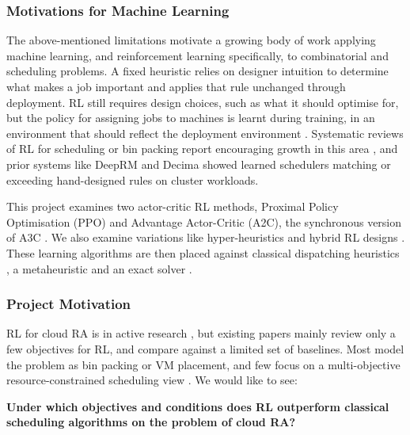 \documentclass[12pt]{article}
\begin{document}
\subsubsection{Motivations for Machine Learning}
The above-mentioned limitations motivate a growing body of work applying machine learning, and reinforcement learning specifically, to combinatorial and scheduling problems. A fixed heuristic relies on designer intuition to determine what makes a job important and applies that rule unchanged through deployment. RL still requires design choices, such as what it should optimise for, but the policy for assigning jobs to machines is learnt during training, in an environment that should reflect the deployment environment \cite{ml_ra_litrev2025}. Systematic reviews of RL for scheduling or bin packing report encouraging growth in this area \cite{DAHMANI2025100616}, and prior systems like DeepRM \cite{mao2016deeprm} and Decima \cite{mao2019decima} showed learned schedulers matching or exceeding hand-designed rules on cluster workloads.

This project examines two actor-critic RL methods, Proximal Policy Optimisation (PPO) and Advantage Actor-Critic (A2C), the synchronous version of A3C \cite{schulman2017ppo, mnih2016a3c, apxml_a2c_a3c_2026, aigreeksActorCritic, chadia2023understandingRL, konda1999actorcritic}. We also examine variations like hyper-heuristics \cite{burke2013hyperheuristicsurvey, lassoued2026hyperheuristic, cie2025dispatchruleselection} and hybrid RL designs \cite{min2022atctuning, chen2024drlgphh}. These learning algorithms are then placed against classical dispatching heuristics \cite{vepsalainen1987atc}, a metaheuristic and an exact solver \cite{ortools}.

\subsubsection{Project Motivation}
RL for cloud RA is in active research \cite{ml_ra_litrev2025, DAHMANI2025100616}, but existing papers mainly review only a few objectives for RL, and compare against a limited set of baselines. Most model the problem as bin packing or VM placement, and few focus on a multi-objective resource-constrained scheduling view \cite{cloud_rco}. We would like to see:
\begin{center}
\textbf{Under which objectives and conditions does RL outperform classical scheduling algorithms on the problem of cloud RA?}
\end{center}
\end{document}
